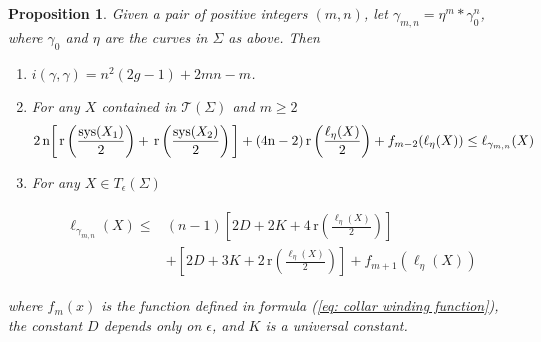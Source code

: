 \documentclass[12pt]{amsart}
\numberwithin{equation}{section}
\theoremstyle{plain}
\newtheorem{prop}[thm]{Proposition}
\begin{document}
 
\begin{prop} \label{prop: separating}
Given a pair of positive integers $(m,n)$, let $\gamma_{m,n}= \eta^{m}\ast  \gamma_{0}^{n}$, where $\gamma_0$ and $\eta$ are the curves in $\Sigma$ as above.  
Then 
\begin{enumerate}
\item  $i(\gamma,\gamma)=
n^{2}(2g - 1) + 2mn - m$.
\item   For any  $X$  contained 
in  $\mathcal{T}(\Sigma)$ and $m \geq 2$
$$ 2 \, \text{n} \bigg[ \, \text{r} \left(\frac{\textup{sys}(X_{1})} {2}\right)+ \, \text{r} \left(\frac{\textup{sys}(X_{2})} {2}\right)\bigg]   +  ( 4\text{n}-2) \, \text{r} \left(\frac{\ell_{\eta} (X)} {2}\right) + f_{m-2}(\ell_{\eta}(X)) \leq \ell_{\gamma_{m,n}}(X) $$

 \item   For any $X \in T_{\epsilon}(\Sigma)$
  
   
\begin{align*}
 \begin{split}
    \ell_{\gamma_{m,n}}(X) \leq & 
 (n-1)\left[2D+ 2K +4\, \text{r}\left(\frac{\ell_{\eta}(X)}{2}\right)   \right]\\
    &+\left[2D+ 3K +2\, \text{r}\left(\frac{\ell_{\eta}(X)}{2}\right)   \right]+ f_{m+1}(\ell_{\eta}(X))
    \end{split}
 \end{align*}

\end{enumerate}
where $f_{m}(x)$ is the function defined in formula 
(\ref{eq: collar winding function}),  the constant $D$ depends only on  $\epsilon$, and $K$ is a universal constant.
\end{prop}
\end{document}
